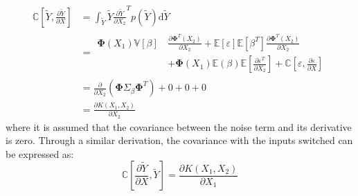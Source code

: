 \documentclass{article}
\begin{document}
\begin{equation}
\label{eq:GPRUntrainedDerivativeCovarianceX2}
	\begin{aligned}
	\mathbb{C}\!\left[\widetilde{Y},\frac{\partial \widetilde{Y}}{\partial X}\right] &= \int_{\widetilde{Y}} \widetilde{Y} \frac{\partial \widetilde{Y}}{\partial X_2}^T p\!\left(\widetilde{Y}\right) \text{d}\widetilde{Y} \\
	&=
	\begin{split}
	\mathbf{\Phi}\!\left(X_1\right) \mathbb{V}\!\left[\beta\right] \, &\frac{\partial \mathbf{\Phi}^T\!\left(X_2\right)}{\partial X_2} + \mathbb{E}\!\left[\varepsilon\right] \mathbb{E}\!\left[\beta^T\right] \frac{\partial \mathbf{\Phi}^T\!\left(X_2\right)}{\partial X_2} \\
	&+ \mathbf{\Phi}\!\left(X_1\right) \mathbb{E}\!\left(\beta\right) \mathbb{E}\!\left[\frac{\partial \varepsilon^T}{\partial X_2}\right] + \mathbb{C}\!\left[\varepsilon,\frac{\partial \varepsilon}{\partial X}\right]
	\end{split}
	\\
	&= \frac{\partial}{\partial X_2} \left(\mathbf{\Phi} \Sigma_\beta \mathbf{\Phi}^T\right) + 0 + 0 + 0 \\
	&= \frac{\partial K\!\left(X_1,X_2\right)}{\partial X_2}
	\end{aligned}
\end{equation}
where it is assumed that the covariance between the noise term and its derivative is zero. Through a similar derivation, the covariance with the inputs switched can be expressed as:
\begin{equation}
\label{eq:GPRUntrainedDerivativeCovarianceX1}
	\mathbb{C}\!\left[\frac{\partial \widetilde{Y}}{\partial X},\widetilde{Y}\right] = \frac{\partial K\!\left(X_1,X_2\right)}{\partial X_1}
\end{equation}
\end{document}
